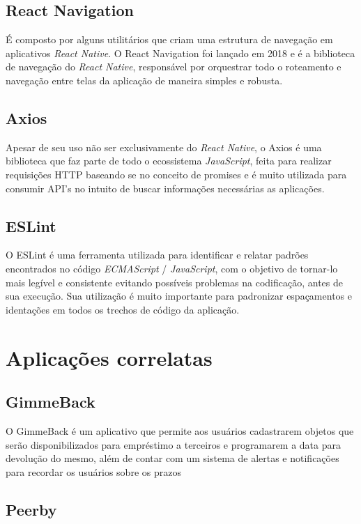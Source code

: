     \subsection{React Navigation}
    É composto por alguns utilitários que criam uma estrutura de navegação em aplicativos \textit{React Native}. O React Navigation foi lançado em 2018 e é a biblioteca de navegação do \textit{React Native}, responsável por orquestrar todo o roteamento e navegação entre telas da aplicação de maneira simples e robusta.
    
    \subsection{Axios}
    Apesar de seu uso não ser exclusivamente do \textit{React Native}, o Axios é uma biblioteca que faz parte de todo o ecossistema \textit{JavaScript}, feita para realizar requisições HTTP baseando se no conceito de promises e é muito utilizada para consumir API's no intuito de buscar informações necessárias as aplicações.
    
    \subsection{ESLint}
    O ESLint é uma ferramenta utilizada para identificar e relatar padrões encontrados no código \textit{ECMAScript} / \textit{JavaScript}, com o objetivo de tornar-lo mais legível e consistente evitando possíveis problemas na codificação, antes de sua execução. Sua utilização é muito importante para padronizar espaçamentos e identações em todos os trechos de código da aplicação.
  
      
    \section{Aplicações correlatas}
    
    \subsection{GimmeBack}
    
    O GimmeBack é um aplicativo que permite aos usuários cadastrarem objetos que serão disponibilizados para empréstimo a terceiros e programarem a data para devolução do mesmo, além de contar com um sistema de alertas e notificações para recordar os usuários sobre os prazos
    
    \subsection{Peerby}
    
